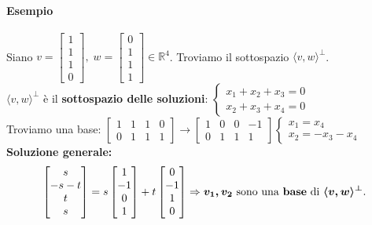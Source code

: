 \documentclass[a4paper, 12pt]{report}
\begin{document}
        \paragraph{Esempio} Siano $v=
        \begin{bmatrix}
            1\\
            1\\
            1\\
            0
        \end{bmatrix},
        \; w=
        \begin{bmatrix}
            0\\
            1\\
            1\\
            1
        \end{bmatrix}
        \in \mathbb{R}^4$. Troviamo il sottospazio $\langle v,w \rangle^\perp$.\\
        $\langle v,w \rangle^\perp$ è il \textbf{sottospazio delle soluzioni}:
        $
        \begin{cases}
            x_1+x_2+x_3=0\\
            x_2+x_3+x_4=0
        \end{cases}
        $\\
        Troviamo una base:
        $
        \begin{bmatrix}
            1 & 1 & 1 & 0\\
            0 & 1 & 1 & 1
        \end{bmatrix}
        \rightarrow
        \begin{bmatrix}
            1 & 0 & 0 & -1\\
            0 & 1 & 1 & 1
        \end{bmatrix}
        \begin{cases}
            x_1=x_4\\
            x_2=-x_3-x_4
        \end{cases}
        $\\
        \textbf{Soluzione generale:}
        $$
        \begin{bmatrix}
            s\\
            -s-t\\
            t\\
            s
        \end{bmatrix}=s
        \begin{bmatrix}
            1\\
            -1\\
            0\\
            1
        \end{bmatrix}+t
        \begin{bmatrix}
            0\\
            -1\\
            1\\
            0
        \end{bmatrix}
        \Rightarrow
        \boldsymbol{v_1, v_2} \text{ sono una \textbf{base} di } \boldsymbol{\langle v,w \rangle^\perp}. 
        $$
\end{document}
